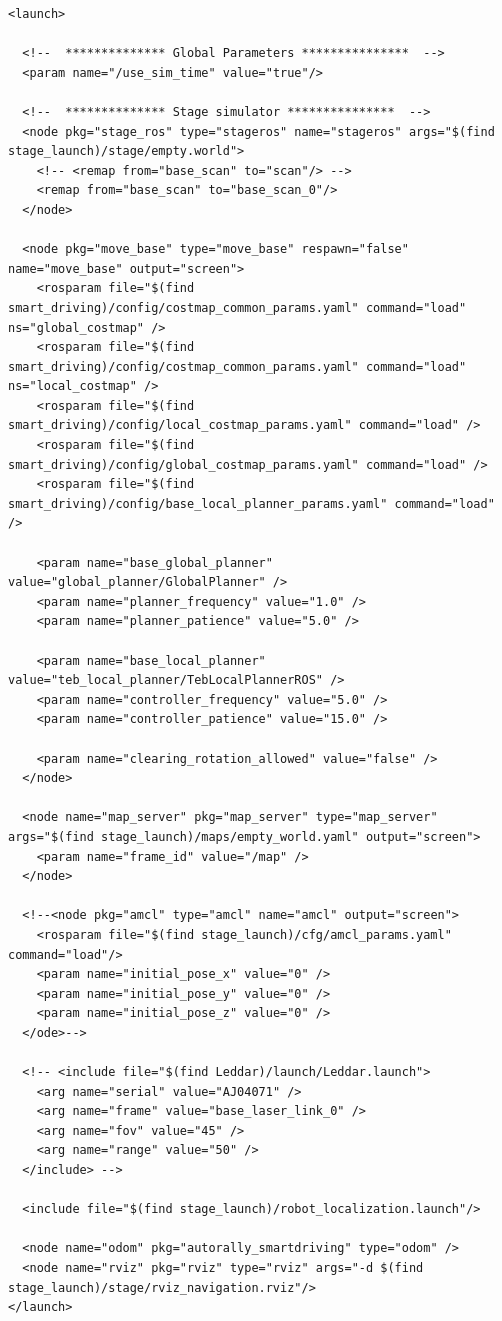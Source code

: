 \documentclass[compsoc,draftclsnofoot,onecolumn,10pt]{IEEEtran}
\begin{document}
\begin{lstlisting}[frame=single,caption={Example Custom Launch File for Stage}]
<launch>

  <!--  ************** Global Parameters ***************  -->
  <param name="/use_sim_time" value="true"/>

  <!--  ************** Stage simulator ***************  -->
  <node pkg="stage_ros" type="stageros" name="stageros" args="$(find stage_launch)/stage/empty.world">
    <!-- <remap from="base_scan" to="scan"/> -->
    <remap from="base_scan" to="base_scan_0"/>
  </node>

  <node pkg="move_base" type="move_base" respawn="false" name="move_base" output="screen">
    <rosparam file="$(find smart_driving)/config/costmap_common_params.yaml" command="load" ns="global_costmap" />
    <rosparam file="$(find smart_driving)/config/costmap_common_params.yaml" command="load" ns="local_costmap" />
    <rosparam file="$(find smart_driving)/config/local_costmap_params.yaml" command="load" />
    <rosparam file="$(find smart_driving)/config/global_costmap_params.yaml" command="load" />
    <rosparam file="$(find smart_driving)/config/base_local_planner_params.yaml" command="load" />

    <param name="base_global_planner" value="global_planner/GlobalPlanner" />
    <param name="planner_frequency" value="1.0" />
    <param name="planner_patience" value="5.0" />

    <param name="base_local_planner" value="teb_local_planner/TebLocalPlannerROS" />
    <param name="controller_frequency" value="5.0" />
    <param name="controller_patience" value="15.0" />

    <param name="clearing_rotation_allowed" value="false" />
  </node>

  <node name="map_server" pkg="map_server" type="map_server" args="$(find stage_launch)/maps/empty_world.yaml" output="screen">
    <param name="frame_id" value="/map" />
  </node>

  <!--<node pkg="amcl" type="amcl" name="amcl" output="screen">
    <rosparam file="$(find stage_launch)/cfg/amcl_params.yaml" command="load"/>
    <param name="initial_pose_x" value="0" />
    <param name="initial_pose_y" value="0" />
    <param name="initial_pose_z" value="0" />
  </ode>-->

  <!-- <include file="$(find Leddar)/launch/Leddar.launch">
    <arg name="serial" value="AJ04071" />
    <arg name="frame" value="base_laser_link_0" />
    <arg name="fov" value="45" />
    <arg name="range" value="50" />
  </include> -->

  <include file="$(find stage_launch)/robot_localization.launch"/>

  <node name="odom" pkg="autorally_smartdriving" type="odom" />
  <node name="rviz" pkg="rviz" type="rviz" args="-d $(find stage_launch)/stage/rviz_navigation.rviz"/>
</launch>
\end{lstlisting}
\end{document}
